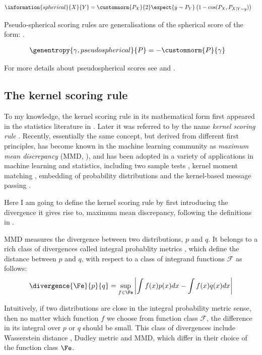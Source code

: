 \begin{align}
	\information{spherical}{X}{Y} &= \customnorm{P_X}{2}\expect{y \sim P_{Y}} \left( 1 - \cos(P_X,P_{X\vert Y=y}) \right)
\end{align}

Pseudo-spherical scoring rules are generalisations of the spherical score of the form: .

\begin{align}
	\genentropy{\gamma,pseudospherical}{P} &= -\customnorm{P}{\gamma}
\end{align}

For more details about pseudospherical scores see \citep{Gneiting2007} and \citep{Jose2008}.

\subsection{The kernel scoring rule}

To my knowledge, the kernel scoring rule in its mathematical form first appeared in the statistics literature in \citep{Eaton1996}. Later it was referred to by the name \emph{kernel scoring rule} \citep{Dawid1999,Dawid2007,Gneiting2007}. Recently, essentially the same concept, but derived from different first principles, has become known in the machine learning community as \emph{maximum mean discrepancy} (MMD, \citep{Sriperumbudur2008}), and has been adopted in a variety of applications in machine learning and statistics, including two sample tests \citep{Gretton2012}, kernel moment matching \citep{Song2008}, embedding of probability distributions\citep{Smola2007} and the kernel-based message passing \citep{Fukumizu2010}.

Here I am going to define the kernel scoring rule by first introducing the divergence it gives rise to, maximum mean discrepancy, following the definitions in \citep{Gretton2012}.

MMD measures the divergence between two distributions, $p$ and $q$. It belongs to a rich class of divergences called integral probablity metrics \citep{Sriperumbudur2009}, which define the distance between  $p$ and $q$, with respect to a class of integrand functions $\mathcal{F}$ as follows:
%
\begin{align}
	\divergence{\Fe}{p}{q} = \sup_{f\in\Fe}\left\vert\int f(x) p(x) dx - \int f(x) q(x) dx \right\vert
\end{align}
	
Intuitively, if two distributions are close in the integral probability metric sense, then no matter which function $f$ we choose from function class $\mathcal{F}$, the difference in its integral over $p$ or $q$ should be small. This class of divergences include Wasserstein distance \citep{Barrio1999}, Dudley metric \citep{Dudley1974} and MMD, which differ in their choice of the function class $\Fe$.

